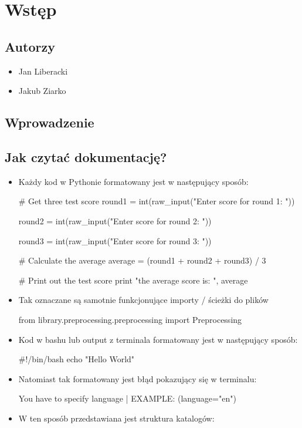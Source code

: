 \section{Wstęp}
 
\subsection{Autorzy}
\begin{itemize}
\item Jan Liberacki
\item Jakub Ziarko
\end{itemize}

\subsection{Wprowadzenie}

\newpage
\subsection{Jak czytać dokumentację?}


\begin{itemize}
\item Każdy kod w Pythonie formatowany jest w następujący sposób:

\begin{python}
# Get three test score
round1 = int(raw_input("Enter score for round 1: "))

round2 = int(raw_input("Enter score for round 2: "))

round3 = int(raw_input("Enter score for round 3: "))
   
# Calculate the average
average = (round1 + round2 + round3) / 3

# Print out the test score
print "the average score is: ", average 

\end{python}

\item Tak oznaczane są samotnie funkcjonujące importy / ścieżki do plików
\begin{import}
from library.preprocessing.preprocessing import Preprocessing
\end{import}

\item Kod w bashu lub output z terminala formatowany jest w następujący sposób:

\begin{bash}
#!/bin/bash
echo "Hello World"
\end{bash}

\item Natomiast tak formatowany jest błąd pokazujący się w terminalu:
\begin{consolerror}
You have to specify language | EXAMPLE: (language="en")
\end{consolerror}



\item W ten sposób przedstawiana jest struktura katalogów:
\myspace
{}

\end{itemize}